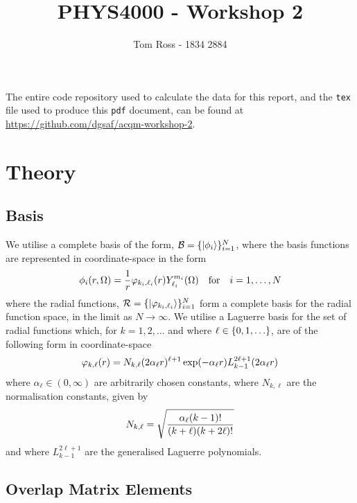 \documentclass[draft]{article}
\title{PHYS4000 - Workshop 2}
\author{Tom Ross - 1834 2884}
\date{}
\newcommand{\lilf}[1]{\lstinline[style=ff]{#1}}
\begin{document}
The entire code repository used to calculate the data for this report, and the
\lilf{tex} file used to produce this \lilf{pdf} document, can be found at
\url{https://github.com/dgsaf/acqm-workshop-2}.

\section*{Theory}

\subsection*{Basis}

We utilise a complete basis of the form,
$\mathcal{B} = \lbrace\ket{\phi_{i}}\rbrace_{i = 1}^{N}$, where the basis functions
are represented in coordinate-space in the form
\begin{equation}
  \label{eq:basis}
  \phi_{i}\lr{r, \Omega}
  =
  \dfrac{1}{r}
  \varphi_{k_{i}, \ell_{i}}\lr{r}
  Y_{\ell_{i}}^{m_{i}}\lr{\Omega}
  \qq{for}
  i = 1, \dotsc, N
\end{equation}
where the radial functions,
$\mathcal{R} = \lbrace\ket{\varphi_{k_{i}, \ell_{i}}}\rbrace_{i = 1}^{N}$ form a
complete basis for the radial function space, in the limit as $N \to \infty$.
We utilise a Laguerre basis for the set of radial functions which,
for $k = 1, 2, \dotsc$ and where $\ell \in \lrset{0, 1, \dotsc}$, are of the
following form in coordinate-space
\begin{equation}
  \label{eq:basis-lag}
  \varphi_{k, \ell}\lr{r}
  =
  N_{k, \ell}
  \lr
  {
    2
    \alpha_{\ell}
    r
  }^{\ell + 1}
  \exponential\lr
  {
    -
    \alpha_{\ell}
    r
  }
  L_{k - 1}^{2 \ell + 1}\lr{2 \alpha_{\ell} r}
\end{equation}
where $\alpha_{\ell} \in (0, \infty)$ are arbitrarily chosen constants,
where $N_{k, \ell}$ are the normalisation constants, given by
\begin{equation}
  \label{eq:basis-lag-norm}
  N_{k, \ell}
  =
  \sqrt
  {
    \dfrac
    {
      \alpha_{\ell}
      (k - 1)!
    }
    {
      (k + \ell)
      (k + 2 \ell)!
    }
  }
\end{equation}
and where $L_{k - 1}^{2 \ell + 1}$ are the generalised Laguerre polynomials.

\subsection*{Overlap Matrix Elements}
\end{document}
